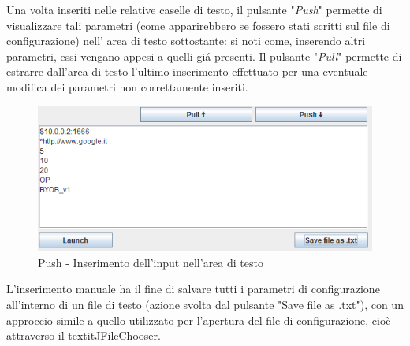 Una volta inseriti nelle relative caselle di testo, il pulsante "\textit{Push}" permette di visualizzare tali parametri (come apparirebbero se fossero stati scritti sul file di configurazione) nell' area di testo sottostante: si noti come, inserendo altri parametri, essi vengano appesi a quelli gi\'a presenti. Il pulsante "\textit{Pull}" permette di estrarre dall'area di testo l'ultimo inserimento effettuato per una eventuale modifica dei parametri non correttamente inseriti.
\begin{figure}[!htb]
        \centering
		\includegraphics[width=0.6\linewidth]{./imgs/textarea}
        \caption{Push - Inserimento dell'input nell'area di testo}
        \vspace*{0.5cm}
\end{figure}

L'inserimento manuale ha il fine di salvare tutti i parametri di configurazione all'interno di un file di testo (azione svolta dal pulsante "Save file as .txt"), con un approccio simile a quello utilizzato per l'apertura del file di configurazione, cio\`e attraverso il textit{JFileChooser}.

